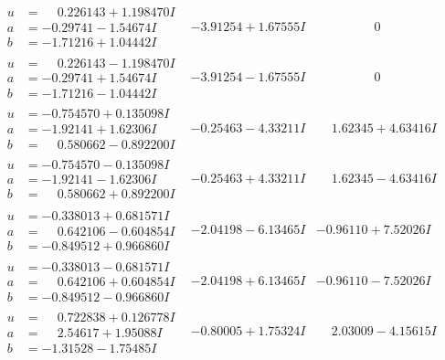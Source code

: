 \documentclass[1p]{elsarticle_modified}
\theoremstyle{definition}
\begin{document}
$$\begin{array}{c|c|c}
\begin{aligned}
u &= \phantom{-}0.226143 + 1.198470 I \\
a &= -0.29741 - 1.54674 I \\
b &= -1.71216 + 1.04442 I\end{aligned}
 & -3.91254 + 1.67555 I & \phantom{-0.000000 } 0 \\ \hline\begin{aligned}
u &= \phantom{-}0.226143 - 1.198470 I \\
a &= -0.29741 + 1.54674 I \\
b &= -1.71216 - 1.04442 I\end{aligned}
 & -3.91254 - 1.67555 I & \phantom{-0.000000 } 0 \\ \hline\begin{aligned}
u &= -0.754570 + 0.135098 I \\
a &= -1.92141 + 1.62306 I \\
b &= \phantom{-}0.580662 - 0.892200 I\end{aligned}
 & -0.25463 - 4.33211 I & \phantom{-}1.62345 + 4.63416 I \\ \hline\begin{aligned}
u &= -0.754570 - 0.135098 I \\
a &= -1.92141 - 1.62306 I \\
b &= \phantom{-}0.580662 + 0.892200 I\end{aligned}
 & -0.25463 + 4.33211 I & \phantom{-}1.62345 - 4.63416 I \\ \hline\begin{aligned}
u &= -0.338013 + 0.681571 I \\
a &= \phantom{-}0.642106 - 0.604854 I \\
b &= -0.849512 + 0.966860 I\end{aligned}
 & -2.04198 - 6.13465 I & -0.96110 + 7.52026 I \\ \hline\begin{aligned}
u &= -0.338013 - 0.681571 I \\
a &= \phantom{-}0.642106 + 0.604854 I \\
b &= -0.849512 - 0.966860 I\end{aligned}
 & -2.04198 + 6.13465 I & -0.96110 - 7.52026 I \\ \hline\begin{aligned}
u &= \phantom{-}0.722838 + 0.126778 I \\
a &= \phantom{-}2.54617 + 1.95088 I \\
b &= -1.31528 - 1.75485 I\end{aligned}
 & -0.80005 + 1.75324 I & \phantom{-}2.03009 - 4.15615 I \\ \hline\begin{aligned}

\end{aligned}
\end{array}$$
\end{document}
